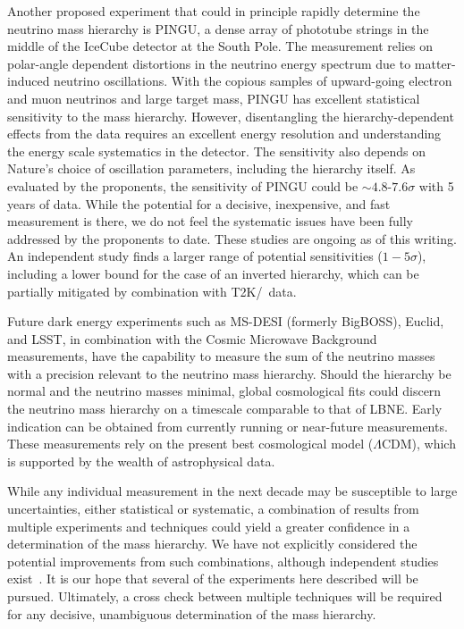 Another proposed experiment that could in principle rapidly determine
the neutrino 
mass hierarchy is PINGU, a dense array of phototube strings in the
middle of the IceCube detector at the South Pole. The measurement relies
on polar-angle dependent distortions in the neutrino energy
spectrum due to matter-induced neutrino
oscillations. With the copious samples of upward-going electron and
muon neutrinos and large target mass, PINGU 
has excellent statistical sensitivity to the mass hierarchy.
However,
disentangling the hierarchy-dependent effects from the data requires
an excellent energy resolution and understanding the energy scale
systematics in the detector.  The sensitivity also depends on Nature's choice of oscillation parameters, including the hierarchy itself.
As evaluated by the proponents,  the sensitivity of PINGU could be $\sim 4.8$-$7.6\sigma$ with 5 years of data.  
While the potential for a decisive,
inexpensive, and fast measurement is there, we do not feel the
systematic issues have been fully addressed by the proponents to
date. These studies are ongoing as of this writing. 
An independent study finds a larger range of potential sensitivities ($1-5\sigma$), including a lower bound for the case of an inverted hierarchy, which can be partially mitigated by combination with T2K/\NOvA\ data. 

Future dark energy experiments such as MS-DESI (formerly BigBOSS),
Euclid, and LSST, in combination with the Cosmic
Microwave Background measurements, have the capability to measure the
sum of the neutrino masses with a precision relevant to the neutrino
mass hierarchy.  Should the hierarchy 
be normal and the neutrino masses minimal, global cosmological fits
could discern the neutrino mass hierarchy on a timescale comparable
to that of LBNE. Early indication can be obtained from  currently
running or near-future measurements. These measurements
rely on the present best cosmological model ($\Lambda$CDM), which is
supported by the wealth of astrophysical data. 

While any individual measurement in the next decade may be susceptible to large uncertainties, either statistical or systematic, a combination of results from multiple experiments and techniques could yield a greater confidence in a determination of the mass hierarchy.  We have not explicitly considered the potential improvements from such combinations, although independent studies exist~\cite{atm:Winter, combo}.  It is  our hope that several of the experiments here described will be pursued.
  Ultimately, a cross check between multiple techniques will be required for any decisive, unambiguous determination of the mass hierarchy.

